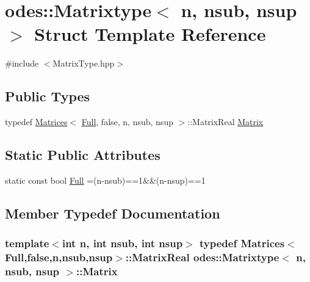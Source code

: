 \hypertarget{structodes_1_1Matrixtype}{}\section{odes\+:\+:Matrixtype$<$ n, nsub, nsup $>$ Struct Template Reference}
\label{structodes_1_1Matrixtype}


{\ttfamily \#include $<$Matrix\+Type.\+hpp$>$}

\subsection*{Public Types}
\begin{DoxyCompactItemize}
\item 
typedef \hyperlink{classodes_1_1Matrices}{Matrices}$<$ \hyperlink{structodes_1_1Matrixtype_a37c01995f06fa3c28fe86cc6a3ce62a3}{Full}, false, n, nsub, nsup $>$\+::Matrix\+Real \hyperlink{structodes_1_1Matrixtype_afa0d0eadde25a06a3530a7781872c0bc}{Matrix}
\end{DoxyCompactItemize}
\subsection*{Static Public Attributes}
\begin{DoxyCompactItemize}
\item 
static const bool \hyperlink{structodes_1_1Matrixtype_a37c01995f06fa3c28fe86cc6a3ce62a3}{Full} =(n-\/nsub)==1\&\&(n-\/nsup)==1
\end{DoxyCompactItemize}


\subsection{Member Typedef Documentation}
\hypertarget{structodes_1_1Matrixtype_afa0d0eadde25a06a3530a7781872c0bc}{}
\subsubsection[{Matrix}]{\setlength{\rightskip}{0pt plus 5cm}template$<$int n, int nsub, int nsup$>$ typedef {\bf Matrices}$<${\bf Full},false,n,nsub,nsup$>$\+::Matrix\+Real {\bf odes\+::\+Matrixtype}$<$ n, nsub, nsup $>$\+::{\bf Matrix}}\label{structodes_1_1Matrixtype_afa0d0eadde25a06a3530a7781872c0bc}


